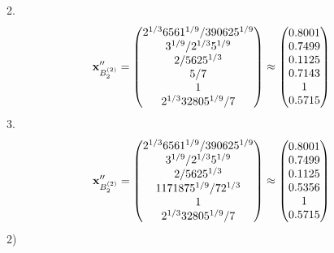 \documentclass[10pt,a4paper]{article}
\begin{document}
	2.
	\[
		\bold{x}''_{B_2^{(2)}} = 
		\begin{pmatrix}
			{{2^ {1 / 3}}{6561^ {1 / 9}}} / {{390625^ {1 / 9}}} \\
			{{3^ {1 / 9}}} / {{2^ {1 / 3}}{5^ {1 / 9}}} \\
			{{2}} / {{5625^ {1 / 3}}} \\
			{{5}} / {{7}} \\
			{1}{} \\
			{{2^ {1 / 3}}{32805^ {1 / 9}}} / {{7}} \\
		\end{pmatrix}
		\approx
		\begin{pmatrix}
			0.8001   \\
			0.7499   \\
			0.1125   \\
			0.7143   \\
			1        \\
			0.5715   \\
		\end{pmatrix}
	\]
	3.
	\[
		\bold{x}''_{B_2^{(2)}} = 
		\begin{pmatrix}
			{{2^ {1 / 3}}{6561^ {1 / 9}}} / {{390625^ {1 / 9}}} \\
			{{3^ {1 / 9}}} / {{2^ {1 / 3}}{5^ {1 / 9}}} \\
			{{2}} / {{5625^ {1 / 3}}} \\
			{{1171875^ {1 / 9}}} / {{7}{2^ {1 / 3}}} \\
			{1}{} \\
			{{2^ {1 / 3}}{32805^ {1 / 9}}} / {{7}} \\
		\end{pmatrix}
		\approx
		\begin{pmatrix}
			0.8001   \\
			0.7499   \\
			0.1125   \\
			0.5356   \\
			1        \\
			0.5715   \\
		\end{pmatrix}
	\]
	2)
\end{document}
